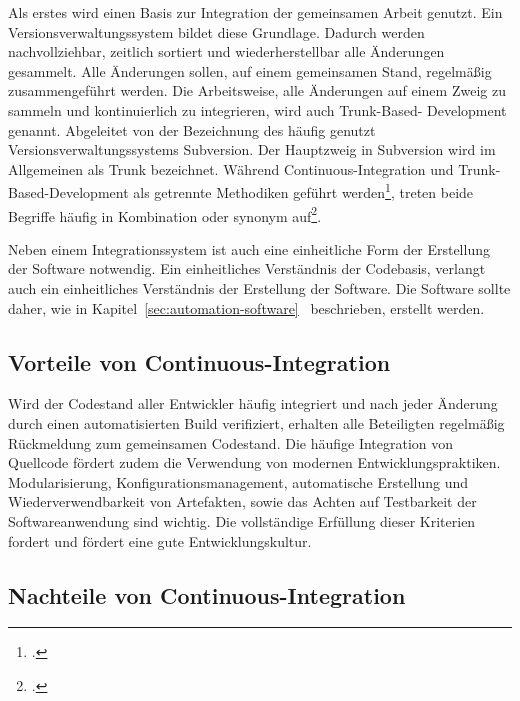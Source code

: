 Als erstes wird einen Basis zur Integration der gemeinsamen Arbeit genutzt. Ein Versionsverwaltungssystem bildet diese Grundlage. Dadurch werden nachvollziehbar, zeitlich sortiert und wiederherstellbar alle Änderungen gesammelt. Alle Änderungen sollen, auf einem gemeinsamen Stand, regelmäßig zusammengeführt werden. Die Arbeitsweise, alle Änderungen auf einem Zweig zu sammeln und kontinuierlich zu integrieren, wird auch Trunk-Based-
Development genannt. Abgeleitet von der Bezeichnung des häufig genutzt Versionsverwaltungssystems Subversion. Der Hauptzweig in Subversion wird im Allgemeinen als \glqq Trunk\grqq{} bezeichnet. Während Continuous-Integration und Trunk-Based-Development als getrennte Methodiken geführt werden\footcite[vgl.][]{trunkbaseddevelopment}, treten beide Begriffe häufig in Kombination oder synonym auf\footcite[vgl.][]{fowler-feature-branch}.

Neben einem Integrationssystem ist auch eine einheitliche Form der Erstellung der Software notwendig. Ein einheitliches Verständnis der Codebasis, verlangt auch ein einheitliches Verständnis der Erstellung der Software. Die Software sollte daher, wie in Kapitel~\ref{sec:automation-software}~ beschrieben, erstellt werden.


\subsection{Vorteile von Continuous-Integration}

Wird der Codestand aller Entwickler häufig integriert und nach jeder Änderung durch einen automatisierten Build verifiziert, erhalten alle Beteiligten regelmäßig Rückmeldung zum gemeinsamen Codestand.
Die häufige Integration von Quellcode fördert zudem die Verwendung von modernen Entwicklungspraktiken. Modularisierung, Konfigurationsmanagement, automatische Erstellung und Wiederverwendbarkeit von Artefakten, sowie das Achten auf Testbarkeit der Softwareanwendung sind wichtig. Die vollständige Erfüllung dieser Kriterien fordert und fördert eine gute Entwicklungskultur.

\subsection{Nachteile von Continuous-Integration}

